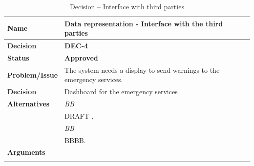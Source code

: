 \begin{table}[h!]
\begin{tabular}{L{0.2\textwidth} L{0.6\textwidth}}
    \textbf{Name} 			& \textbf{Data representation - Interface with the third parties} \\ \toprule
    \textbf{Decision} 		& \textbf{DEC-4}\\ \midrule
    \textbf{Status} 		& \textbf{Approved} \\ \midrule
    \textbf{Problem/Issue} 	& The system needs a display to send warnings to the emergency services. \\ \midrule
    \textbf{Decision} 		& Dashboard for the emergency services\\ \midrule
    \textbf{Alternatives} 	& \textit{BB}\\
    						& DRAFT .\\
    						& \textit{BB}\\
    						& BBBB.\\
    						\midrule
    \textbf{Arguments} 		& \\

    \\ \bottomrule
\end{tabular}
\caption{Decision -- Interface with third parties}
\label{table:linux}
\end{table}



